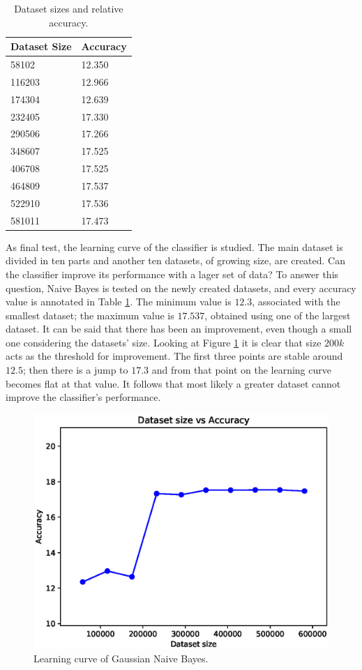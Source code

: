 \documentclass[a4paper, 10pt]{article}
\begin{document}
\begin{table}[H]
\centering
\begin{tabular}{|l|l|}
\hline
\textbf{Dataset Size} & \textbf{Accuracy}\\\hline
58102 & 12.350\\\hline
116203 & 12.966\\\hline
174304 & 12.639\\\hline
232405 & 17.330\\\hline
290506 & 17.266\\\hline
348607 & 17.525\\\hline
406708 & 17.525\\\hline
464809 & 17.537\\\hline
522910 & 17.536\\\hline
581011 & 17.473\\\hline
\end{tabular}
\caption{Dataset sizes and relative accuracy.}
\label{tab:gnb_learning}
\end{table}

As final test, the learning curve of the classifier is studied. The main dataset is divided in ten parts and another ten datasets, of growing size, are created. Can the classifier improve its performance with a lager set of data? To answer this question, Naive Bayes is tested on the newly created datasets, and every accuracy value is annotated in Table \ref{tab:gnb_learning}. The minimum value is $12.3$, associated with the smallest dataset; the maximum value is $17.537$, obtained using one of the largest dataset. It can be said that there has been an improvement, even though a small one considering the datasets' size. Looking at Figure \ref{fig:gnb_learning} it is clear that size $200k$ acts as the threshold for improvement. The first three points are stable around $12.5$; then there is a jump to $17.3$ and from that point on the learning curve becomes flat at that value. It follows that most likely a greater dataset cannot improve the classifier's performance.

\begin{figure}[H]
 \centering
 \includegraphics[width=0.8\linewidth]{pictures/nb_gaussian_size_vs_accuracy.eps}
 \caption{Learning curve of Gaussian Naive Bayes.}
 \label{fig:gnb_learning}
\end{figure}
\end{document}
